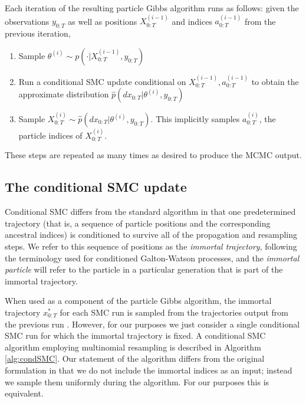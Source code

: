\documentclass[fleqn]{article}
\theoremstyle{definition}
\begin{document}
Each iteration of the resulting particle Gibbs algorithm runs as follows: 
given the observations $y_{0:T}$ as well as positions $X_{0:T}^{(i-1)}$ and indices $a_{0:T}^{(i-1)}$ from the previous iteration,
\begin{enumerate}
\item Sample $\theta^{(i)} \sim p(\cdot | X_{0:T}^{(i-1)}, y_{0:T})$
\item Run a conditional SMC update conditional on $X_{0:T}^{(i-1)}, a_{0:T}^{(i-1)}$ to obtain the approximate distribution $\hat{p}(dx_{0:T} | \theta^{(i)}, y_{0:T})$
\item Sample $X_{0:T}^{(i)} \sim \hat{p}(dx_{0:T} | \theta^{(i)}, y_{0:T})$. This implicitly samples $a_{0:T}^{(i)}$, the particle indices of $X_{0:T}^{(i)}$.
\end{enumerate}
These steps are repeated as many times as desired to produce the MCMC output.

\subsection{The conditional SMC update}\label{sec:condSMC_alg}
Conditional SMC differs from the standard algorithm in that one predetermined trajectory (that is, a sequence of particle positions and the corresponding ancestral indices) is conditioned to survive all of the propagation and resampling steps. 
We refer to this sequence of positions as the \emph{immortal trajectory}, following the terminology used for conditioned Galton-Watson processes, and the \emph{immortal particle} will refer to the particle in a particular generation that is part of the immortal trajectory.

When used as a component of the particle Gibbs algorithm, the immortal trajectory $x_{0:T}^*$ for each SMC run is sampled from the trajectories output from the previous run \citep[Section 2.4.3]{andrieu2010}. However, for our purposes we just consider a single conditional SMC run for which the immortal trajectory is fixed. 
A conditional SMC algorithm employing multinomial resampling is described in Algorithm \ref{alg:condSMC}.
Our statement of the algorithm differs from the original formulation in that we do not include the immortal indices as an input; instead we sample them uniformly during the algorithm. For our purposes this is equivalent.
\end{document}
